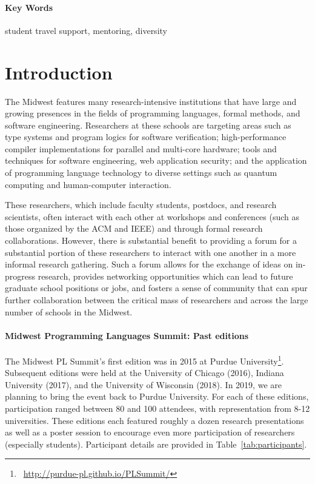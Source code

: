 \documentclass[11pt]{article}
\newcommand{\parahead}[1]{\paragraph{#1}}
\def\mwpls{Midwest Programming Languages Summit}
\begin{document}
\parahead{Key Words} student travel support, mentoring,
diversity

\newpage
{}
\setcounter{page}{1}

\section{Introduction}

The Midwest features many research-intensive institutions that have large and growing presences in the fields of programming languages, formal methods, and software engineering. Researchers at these schools are targeting areas such as
type systems and program logics for
software verification; high-performance compiler implementations for
parallel and multi-core hardware; tools and techniques for software
engineering, web application security; and the application of
programming language technology to diverse settings such as quantum
computing and human-computer interaction.

These researchers, which include faculty students, postdocs, and research scientists, often interact with each other at workshops and conferences (such as those organized by the ACM and IEEE) and through formal research collaborations. However, there is substantial benefit to providing a forum for a substantial portion of these researchers to interact with one another in a more informal research gathering. Such a forum allows for the exchange of ideas on in-progress research, provides networking opportunities which can lead to future graduate school positions or jobs, and fosters a sense of community that can spur further collaboration between the critical mass of researchers and across the large number of schools in the Midwest.

\parahead{\mwpls{}: Past editions}

The Midwest PL Summit's first edition was in 2015 at Purdue University\footnote{~\url{http://purdue-pl.github.io/PLSummit/}}. Subsequent editions were held at the University of Chicago (2016), Indiana University (2017), and the University of Wisconsin (2018). In 2019, we are planning to bring the event back to Purdue University. For each of these editions, participation ranged between 80 and 100 attendees, with representation from 8-12 universities. These editions each featured roughly a dozen research presentations as well as a poster session to encourage even more participation of researchers (especially students). Participant details are provided in Table~\ref{tab:participants}.
\end{document}
